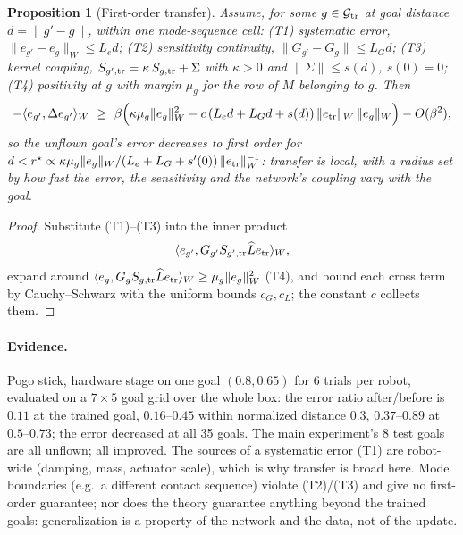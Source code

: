 \documentclass[11pt]{article}
\newtheorem{proposition}[theorem]{Proposition}
\theoremstyle{definition}
\theoremstyle{remark}
\newcommand{\cG}{\mathcal{G}}
\newcommand{\ip}[2]{\langle #1,#2\rangle_W}
\newcommand{\nW}[1]{\lVert #1\rVert_W}
\newcommand{\n}[1]{\lVert #1\rVert}
\newcommand{\Lhat}{\widehat L}
\begin{document}
\begin{proposition}[First-order transfer]\label{prop:transfer}
Assume, for some $g\in\cG_{\rm tr}$ at goal distance $d=\n{g'-g}$, within one mode-sequence cell:
(T1) systematic error, $\nW{e_{g'}-e_g}\le L_ed$; (T2) sensitivity continuity, $\n{G_{g'}-G_g}\le L_Gd$; (T3) kernel
coupling, $S_{g',{\rm tr}}=\kappa\,S_{g,{\rm tr}}+\Sigma$ with $\kappa>0$ and $\n{\Sigma}\le s(d)$, $s(0)=0$;
(T4) positivity at $g$ with margin $\mu_g$ for the row of $M$ belonging to $g$. Then
\[-\ip{e_{g'}}{\Delta e_{g'}}\ \ge\ \beta\Big(\kappa\mu_g\nW{e_g}^2-c\,(L_ed+L_Gd+s(d))\,\nW{e_{\rm tr}}\,\nW{e_g}\Big)
-O(\beta^2),\]
so the unflown goal's error decreases to first order for $d<r^\star\propto\kappa\mu_g\nW{e_g}/(L_e+L_G+s'(0))\,
\nW{e_{\rm tr}}^{-1}$: transfer is local, with a radius set by how fast the error, the sensitivity and the network's
coupling vary with the goal.
\end{proposition}
\begin{proof}
Substitute (T1)--(T3) into the inner product
\[\ip{e_{g'}}{G_{g'}S_{g',{\rm tr}}\Lhat e_{\rm tr}},\]
expand around $\ip{e_g}{G_gS_{g,{\rm tr}}\Lhat e_{\rm tr}}\ge\mu_g\nW{e_g}^2$ (T4), and bound each cross term by
Cauchy--Schwarz with the uniform bounds $c_G,c_L$; the constant $c$ collects them.
\end{proof}
\paragraph{Evidence.} Pogo stick, hardware stage on one goal $(0.8,0.65)$ for 6 trials per robot, evaluated on a
$7\times5$ goal grid over the whole box: the error ratio after/before is $0.11$ at the trained goal, $0.16$--$0.45$
within normalized distance $0.3$, $0.37$--$0.89$ at $0.5$--$0.73$; the error decreased at all 35 goals. The main
experiment's 8 test goals are all unflown; all improved. The sources of a systematic error (T1) are robot-wide
(damping, mass, actuator scale), which is why transfer is broad here. Mode boundaries (e.g.\ a different contact
sequence) violate (T2)/(T3) and give no first-order guarantee; nor does the theory guarantee anything beyond the trained
goals: generalization is a property of the network and the data, not of the update.

\end{document}

